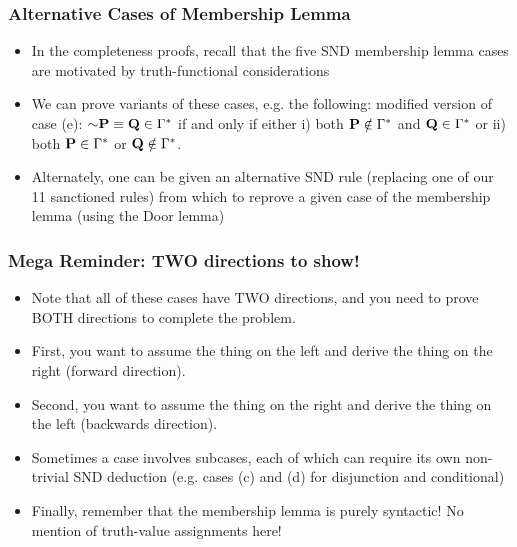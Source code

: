 \begin{frame}
\frametitle{Alternative Cases of Membership Lemma}

\begin{itemize}[<+->]

\item In the completeness proofs, recall that the five SND membership lemma cases are motivated by truth-functional considerations

\item We can prove variants of these cases, e.g. the following: modified version of case (e): $\sim\BM{P}\equiv\BM{Q}\in\Gamma^{\ast}$ if and only if either i) both $\mathbf{P}\notin\Gamma^{\ast}$ and $\mathbf{Q}\in\Gamma^{\ast}$ or ii) both $\mathbf{P}\in\Gamma^{\ast}$ or $\mathbf{Q}\notin\Gamma^{\ast}$.

\item Alternately, one can be given an alternative SND rule (replacing one of our 11 sanctioned rules) from which to reprove a given case of the membership lemma (using the Door lemma)

\end{itemize}
\end{frame}

\begin{frame}
\frametitle{Mega Reminder: TWO directions to show!}

\begin{itemize}[<+->]

\item Note that all of these cases have TWO directions, and you need to prove BOTH directions to complete the problem. 
\item[] First, you want to assume the thing on the left and derive the thing on the right (forward direction). 
\item[] Second, you want to assume the thing on the right and derive the thing on the left (backwards direction).

\item Sometimes a case involves subcases, each of which can require its own non-trivial SND deduction (e.g. cases (c) and (d) for disjunction and conditional)

\item Finally, remember that the membership lemma is purely syntactic! No mention of truth-value assignments here!

\end{itemize}
\end{frame}


